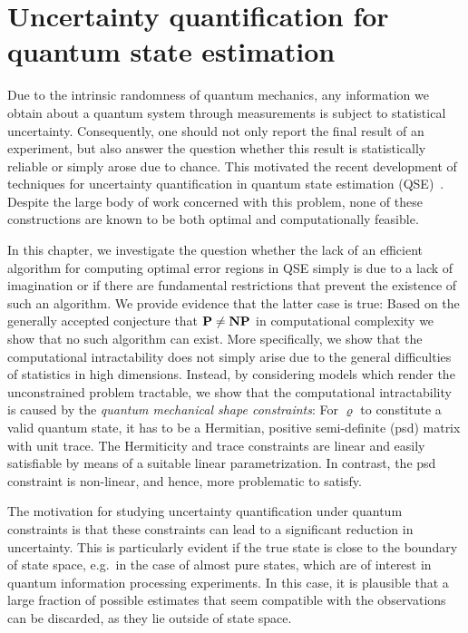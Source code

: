 
\chapter{Uncertainty quantification for quantum state estimation}%
\label{chap:error}


Due to the intrinsic randomness of quantum mechanics, any information we obtain about a quantum system through measurements is subject to statistical uncertainty.
Consequently, one should not only report the final result of an experiment, but also answer the question whether this result is statistically reliable or simply arose due to chance.
This motivated the recent development of techniques for uncertainty quantification in quantum state estimation (QSE)~\cite{Kohout_2012_Robust,Ferrie_2014_High,Shang_2013_Optimal,Faist_2015_Practical,Christandl_2012_Reliable,Audenaert_2009_Quantum,Audenaert_2008_Asymptotic}.
Despite the large body of work concerned with this problem, none of these constructions are known to be both optimal and computationally feasible.

In this chapter, we investigate the question whether the lack of an efficient algorithm for computing optimal error regions in QSE simply is due to a lack of imagination or if there are fundamental restrictions that prevent the existence of such an algorithm.
We provide evidence that the latter case is true:
Based on the generally accepted conjecture that $\mathbf{P} \neq \mathbf{NP}$ in computational complexity we show that no such algorithm can exist.
More specifically, we show that the computational intractability does not simply arise due to the  general difficulties of statistics in high dimensions.
Instead, by considering models which render the unconstrained problem tractable, we show that the computational intractability is caused by the \emph{quantum mechanical shape constraints}:
For $\varrho$ to constitute a valid quantum state, it has to be a Hermitian, positive semi-definite (psd) matrix with unit trace.
The Hermiticity and trace constraints are linear and easily satisfiable by means of a suitable linear parametrization.
In contrast, the psd constraint is non-linear, and hence, more problematic to satisfy.

The motivation for studying uncertainty quantification under quantum constraints is that these constraints can lead to a significant reduction in uncertainty.
This is particularly evident if the true state is close to the boundary of state space, e.g.\ in the case of almost pure states, which are of interest in quantum information processing experiments.
In this case, it is plausible that a large fraction of possible estimates that seem compatible with the observations can be discarded, as they lie outside of state space.


